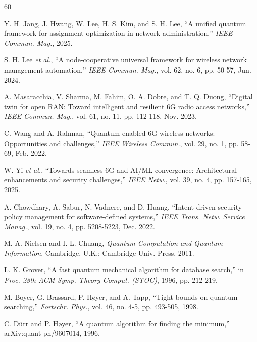 \documentclass[journal]{IEEEtran}
\begin{document}
\begin{thebibliography}{60}

Y. H. Jang, J. Hwang, W. Lee, H. S. Kim, and S. H. Lee, ``A unified
quantum framework for assignment optimization in network
administration,'' \emph{IEEE Commun. Mag.}, 2025.

S. H. Lee \emph{et al.}, ``A node-cooperative universal framework
for wireless network management automation,'' \emph{IEEE Commun.
Mag.}, vol. 62, no. 6, pp. 50-57, Jun. 2024.

A. Masaracchia, V. Sharma, M. Fahim, O. A. Dobre, and T. Q. Duong,
``Digital twin for open RAN: Toward intelligent and resilient 6G
radio access networks,'' \emph{IEEE Commun. Mag.}, vol. 61, no. 11,
pp. 112-118, Nov. 2023.

C. Wang and A. Rahman, ``Quantum-enabled 6G wireless networks:
Opportunities and challenges,'' \emph{IEEE Wireless Commun.},
vol. 29, no. 1, pp. 58-69, Feb. 2022.

W. Yi \emph{et al.}, ``Towards seamless 6G and AI/ML convergence:
Architectural enhancements and security challenges,'' \emph{IEEE
Netw.}, vol. 39, no. 4, pp. 157-165, 2025.

A. Chowdhary, A. Sabur, N. Vadnere, and D. Huang, ``Intent-driven
security policy management for software-defined systems,''
\emph{IEEE Trans. Netw. Service Manag.}, vol. 19, no. 4,
pp. 5208-5223, Dec. 2022.

M. A. Nielsen and I. L. Chuang, \emph{Quantum Computation and
Quantum Information}. Cambridge, U.K.: Cambridge Univ. Press, 2011.

L. K. Grover, ``A fast quantum mechanical algorithm for database
search,'' in \emph{Proc. 28th ACM Symp. Theory Comput. (STOC)},
1996, pp. 212-219.

M. Boyer, G. Brassard, P. H\o yer, and A. Tapp, ``Tight bounds on
quantum searching,'' \emph{Fortschr. Phys.}, vol. 46, no. 4-5,
pp. 493-505, 1998.

C. D\"urr and P. H\o yer, ``A quantum algorithm for finding the
minimum,'' arXiv:quant-ph/9607014, 1996.


\end{thebibliography}
\end{document}
